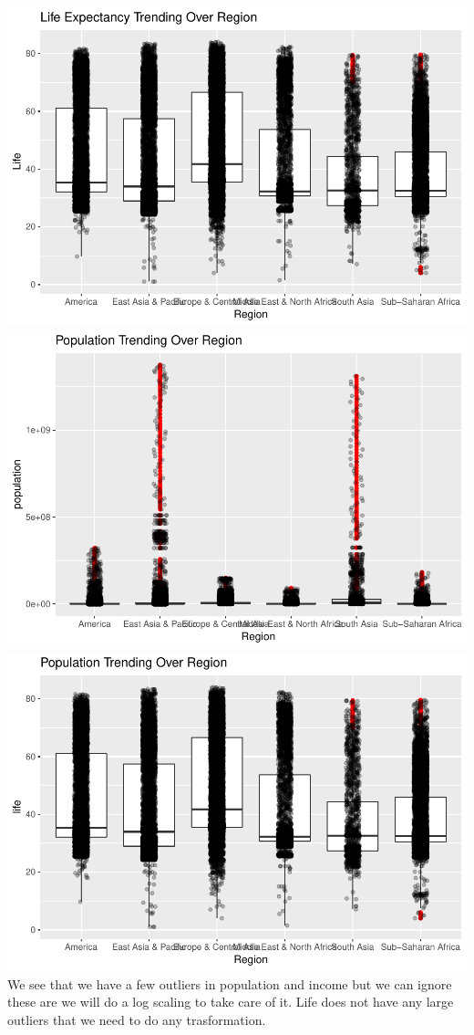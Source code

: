 \documentclass[]{article}
\begin{document}
\includegraphics{Final_Project_files/figure-latex/Outliers-1.pdf}
\includegraphics{Final_Project_files/figure-latex/Outliers-2.pdf}
\includegraphics{Final_Project_files/figure-latex/Outliers-3.pdf} We see
that we have a few outliers in population and income but we can ignore
these are we will do a log scaling to take care of it. Life does not
have any large outliers that we need to do any trasformation.
\end{document}
